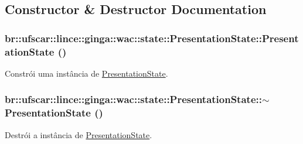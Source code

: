 \subsection{Constructor \& Destructor Documentation}
\hypertarget{classbr_1_1ufscar_1_1lince_1_1ginga_1_1wac_1_1state_1_1PresentationState_aa48f61ac6a0cf382182bd6fb4f548b87}{
\subsubsection[{PresentationState}]{\setlength{\rightskip}{0pt plus 5cm}br::ufscar::lince::ginga::wac::state::PresentationState::PresentationState ()}}
\label{classbr_1_1ufscar_1_1lince_1_1ginga_1_1wac_1_1state_1_1PresentationState_aa48f61ac6a0cf382182bd6fb4f548b87}


Constrói uma instância de \hyperlink{classbr_1_1ufscar_1_1lince_1_1ginga_1_1wac_1_1state_1_1PresentationState}{PresentationState}. 

\hypertarget{classbr_1_1ufscar_1_1lince_1_1ginga_1_1wac_1_1state_1_1PresentationState_a324581a9a822f53cf7365321ae35f2ec}{
\subsubsection[{$\sim$PresentationState}]{\setlength{\rightskip}{0pt plus 5cm}br::ufscar::lince::ginga::wac::state::PresentationState::$\sim$PresentationState ()}}
\label{classbr_1_1ufscar_1_1lince_1_1ginga_1_1wac_1_1state_1_1PresentationState_a324581a9a822f53cf7365321ae35f2ec}


Destrói a instância de \hyperlink{classbr_1_1ufscar_1_1lince_1_1ginga_1_1wac_1_1state_1_1PresentationState}{PresentationState}. 



